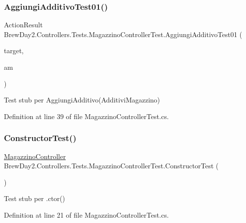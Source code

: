 \subsubsection{\texorpdfstring{Aggiungi\+Additivo\+Test01()}{AggiungiAdditivoTest01()}}
{\footnotesize\ttfamily Action\+Result Brew\+Day2.\+Controllers.\+Tests.\+Magazzino\+Controller\+Test.\+Aggiungi\+Additivo\+Test01 (\begin{DoxyParamCaption}\item[{\mbox{[}\+Pex\+Assume\+Under\+Test\mbox{]} \mbox{\hyperlink{class_brew_day2_1_1_controllers_1_1_magazzino_controller}{Magazzino\+Controller}}}]{target,  }\item[{\mbox{\hyperlink{class_brew_day2_1_1_models_1_1_additivi_magazzino}{Additivi\+Magazzino}}}]{am }\end{DoxyParamCaption})}



Test stub per Aggiungi\+Additivo(\+Additivi\+Magazzino)



Definition at line 39 of file Magazzino\+Controller\+Test.\+cs.

\mbox{\label{class_brew_day2_1_1_controllers_1_1_tests_1_1_magazzino_controller_test_a6973f384a669af5ee1c898a76c700a67}} 
\subsubsection{\texorpdfstring{Constructor\+Test()}{ConstructorTest()}}
{\footnotesize\ttfamily \mbox{\hyperlink{class_brew_day2_1_1_controllers_1_1_magazzino_controller}{Magazzino\+Controller}} Brew\+Day2.\+Controllers.\+Tests.\+Magazzino\+Controller\+Test.\+Constructor\+Test (\begin{DoxyParamCaption}{ }\end{DoxyParamCaption})}



Test stub per .ctor()



Definition at line 21 of file Magazzino\+Controller\+Test.\+cs.

